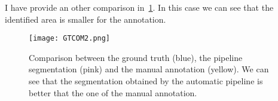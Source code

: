 \documentclass{standalone}
\begin{document}
	I have provide an other comparison in \figurename\,\ref{fig:conf2}. In this case we can see that the identified area is smaller for the annotation. 

		\begin{figure}[h!]
		\texttt{[image: GTCOM2.png]}
		
		\caption{Comparison between the ground truth (blue), the pipeline segmentation (pink) and the manual annotation (yellow). We can see that the segmentation obtained by the automatic pipeline is better that the one of the manual annotation.}\label{fig:conf2}
	\end{figure}
	
	
	
	
	
	
	
	
	
	
	 
	
		
	
\end{document}
